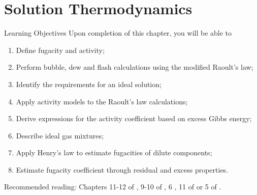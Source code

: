 \chapter{Solution Thermodynamics}\label{Chapter:SolutionThermodynamics}


   \begin{LearningObjectivesBlock}{Learning Objectives}
      Upon completion of this chapter, you will be able to
        \begin{enumerate}
           \item Define fugacity and activity;
           \item Perform bubble, dew and flash calculations using the modified Raoult's law;
           \item Identify the requirements for an ideal solution;
           \item Apply activity models to the Raoult's law calculations;
           \item Derive expressions for the activity coefficient based on excess Gibbs energy;
           \item Describe ideal gas mixtures;
           \item Apply Henry's law to estimate fugacities of dilute components;
           \item Estimate fugacity coefficient through residual and excess properties.
        \end{enumerate}
\medskip
     Recommended reading: Chapters 11-12 of \citet{SmithVanNess_Book}, 9-10 of \cite{Sandler_Book}, 6 \citet{Lue_Book}, 11 of \citet{Elliot_Book} or 5 of \citet{Atkins_Book}.
   \end{LearningObjectivesBlock}


\begin{comment}
   \begin{LearningObjectivesBlock}{Learning Objectives}
      Upon completion of this chapter, you will be able to
        \begin{enumerate}
           \item {\bf Knowledge:} Define, Name, Select, State 
           \item {\bf Comprehension:} Describe, Identify, Discuss
           \item {\bf Application:} Apply, Demonstrate, Employ, Sketch
           \item {\bf Analysis:} Analyse, Compare, Calculate, Solve
           \item {\bf Synthesis:} Determine, Formulate
           \item {\bf Evaluation:} Assess, Check, Estimate, Compare, Measure, Monitor
        \end{enumerate}
\end{comment}

